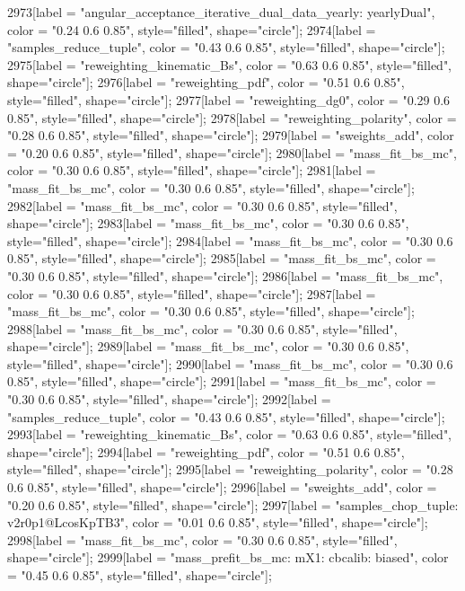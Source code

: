 {	2973[label = "angular_acceptance_iterative_dual_data_yearly\nangacc: yearlyDual", color = "0.24 0.6 0.85", style="filled", shape="circle"];
	2974[label = "samples_reduce_tuple", color = "0.43 0.6 0.85", style="filled", shape="circle"];
	2975[label = "reweighting_kinematic_Bs", color = "0.63 0.6 0.85", style="filled", shape="circle"];
	2976[label = "reweighting_pdf", color = "0.51 0.6 0.85", style="filled", shape="circle"];
	2977[label = "reweighting_dg0", color = "0.29 0.6 0.85", style="filled", shape="circle"];
	2978[label = "reweighting_polarity", color = "0.28 0.6 0.85", style="filled", shape="circle"];
	2979[label = "sweights_add", color = "0.20 0.6 0.85", style="filled", shape="circle"];
	2980[label = "mass_fit_bs_mc", color = "0.30 0.6 0.85", style="filled", shape="circle"];
	2981[label = "mass_fit_bs_mc", color = "0.30 0.6 0.85", style="filled", shape="circle"];
	2982[label = "mass_fit_bs_mc", color = "0.30 0.6 0.85", style="filled", shape="circle"];
	2983[label = "mass_fit_bs_mc", color = "0.30 0.6 0.85", style="filled", shape="circle"];
	2984[label = "mass_fit_bs_mc", color = "0.30 0.6 0.85", style="filled", shape="circle"];
	2985[label = "mass_fit_bs_mc", color = "0.30 0.6 0.85", style="filled", shape="circle"];
	2986[label = "mass_fit_bs_mc", color = "0.30 0.6 0.85", style="filled", shape="circle"];
	2987[label = "mass_fit_bs_mc", color = "0.30 0.6 0.85", style="filled", shape="circle"];
	2988[label = "mass_fit_bs_mc", color = "0.30 0.6 0.85", style="filled", shape="circle"];
	2989[label = "mass_fit_bs_mc", color = "0.30 0.6 0.85", style="filled", shape="circle"];
	2990[label = "mass_fit_bs_mc", color = "0.30 0.6 0.85", style="filled", shape="circle"];
	2991[label = "mass_fit_bs_mc", color = "0.30 0.6 0.85", style="filled", shape="circle"];
	2992[label = "samples_reduce_tuple", color = "0.43 0.6 0.85", style="filled", shape="circle"];
	2993[label = "reweighting_kinematic_Bs", color = "0.63 0.6 0.85", style="filled", shape="circle"];
	2994[label = "reweighting_pdf", color = "0.51 0.6 0.85", style="filled", shape="circle"];
	2995[label = "reweighting_polarity", color = "0.28 0.6 0.85", style="filled", shape="circle"];
	2996[label = "sweights_add", color = "0.20 0.6 0.85", style="filled", shape="circle"];
	2997[label = "samples_chop_tuple\nversion: v2r0p1@LcosKpTB3", color = "0.01 0.6 0.85", style="filled", shape="circle"];
	2998[label = "mass_fit_bs_mc", color = "0.30 0.6 0.85", style="filled", shape="circle"];
	2999[label = "mass_prefit_bs_mc\nmassbin: mX1\nmassmodel: cbcalib\ntrigger: biased", color = "0.45 0.6 0.85", style="filled", shape="circle"];
}
